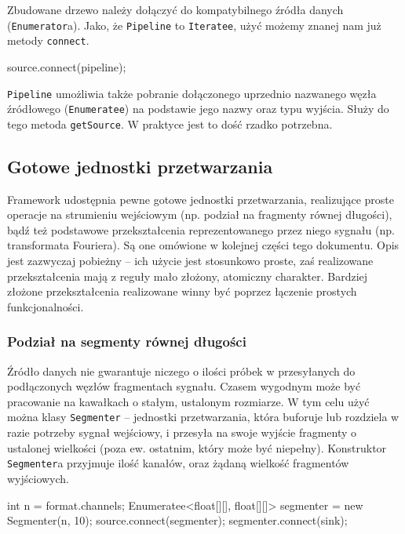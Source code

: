 Zbudowane drzewo należy dołączyć do kompatybilnego źródła danych (\texttt{Enumerator}a). Jako, że
\texttt{Pipeline} to \texttt{Iteratee}, użyć możemy znanej nam już metody \texttt{connect}.

\begin{java}
source.connect(pipeline);
\end{java}

\texttt{Pipeline} umożliwia także pobranie dołączonego uprzednio nazwanego węzła źródłowego
(\texttt{Enumeratee}) na podstawie jego nazwy oraz typu wyjścia. Służy do tego metoda
\texttt{getSource}. W praktyce jest to dość rzadko potrzebna.


\subsection{Gotowe jednostki przetwarzania}

Framework udostępnia pewne gotowe jednostki przetwarzania, realizujące proste operacje na strumieniu
wejściowym (np. podział na fragmenty równej długości), bądź też podstawowe przekształcenia
reprezentowanego przez niego sygnału (np. transformata Fouriera). Są one omówione w kolejnej części
tego dokumentu. Opis jest zazwyczaj pobieżny -- ich użycie jest stosunkowo proste, zaś realizowane
przekształcenia mają z reguły mało złożony, atomiczny charakter. Bardziej złożone przekształcenia
realizowane winny być poprzez łączenie prostych funkcjonalności.


\subsubsection{Podział na segmenty równej długości}

Źródło danych nie gwarantuje niczego o ilości próbek w przesyłanych do podłączonych węzłów
fragmentach sygnału. Czasem wygodnym może być pracowanie na kawałkach o stałym, ustalonym rozmiarze.
W tym celu użyć można klasy \texttt{Segmenter} -- jednostki przetwarzania, która buforuje lub
rozdziela w razie potrzeby sygnał wejściowy, i przesyła na swoje wyjście fragmenty o ustalonej
wielkości (poza ew. ostatnim, który może być niepełny). Konstruktor \texttt{Segmenter}a przyjmuje
ilość kanałów, oraz żądaną wielkość fragmentów wyjściowych.

\begin{java}
int n = format.channels;
Enumeratee<float[][], float[][]> segmenter = new Segmenter(n, 10);
source.connect(segmenter);
segmenter.connect(sink);
\end{java}

